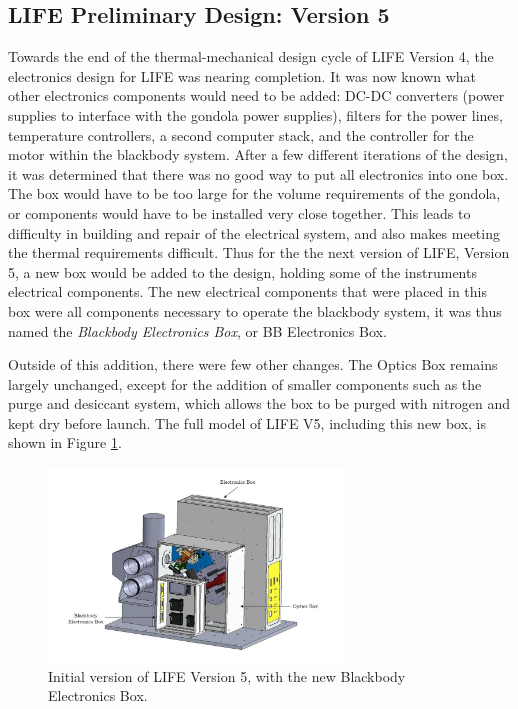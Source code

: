 \subsection{LIFE Preliminary Design: Version 5}
Towards the end of the thermal-mechanical design cycle of LIFE Version 4, the electronics design for LIFE was nearing completion. It was now known what other electronics components would need to be added: DC-DC converters (power supplies to interface with the gondola power supplies), filters for the power lines, temperature controllers, a second computer stack, and the controller for the motor within the blackbody system. After a few different iterations of the design, it was determined that there was no good way to put all electronics into one box. The box would have to be too large for the volume requirements of the gondola, or components would have to be installed very close together. This leads to difficulty in building and repair of the electrical system, and also makes meeting the thermal requirements difficult. Thus for the the next version of LIFE, Version 5, a new box would be added to the design, holding some of the instruments electrical components. The new electrical components that were placed in this box were all components necessary to operate the blackbody system, it was thus named the \textit{Blackbody Electronics Box}, or BB Electronics Box. 

Outside of this addition, there were few other changes. The Optics Box remains largely unchanged, except for the addition of smaller components such as the purge and desiccant system, which allows the box to be purged with nitrogen and kept dry before launch. The full model of LIFE V5, including this new box, is shown in Figure \ref{fig:LIFE_V5_prelim}.

\begin{figure}
    \centering
    \includegraphics[width=0.7\textwidth]{chap3_images/LIFE_V5_initial_images/LIFE_V5_prelim_labelled_jpeg.JPG}
    \caption{Initial version of LIFE Version 5, with the new Blackbody Electronics Box.}
    \label{fig:LIFE_V5_prelim}
\end{figure}

